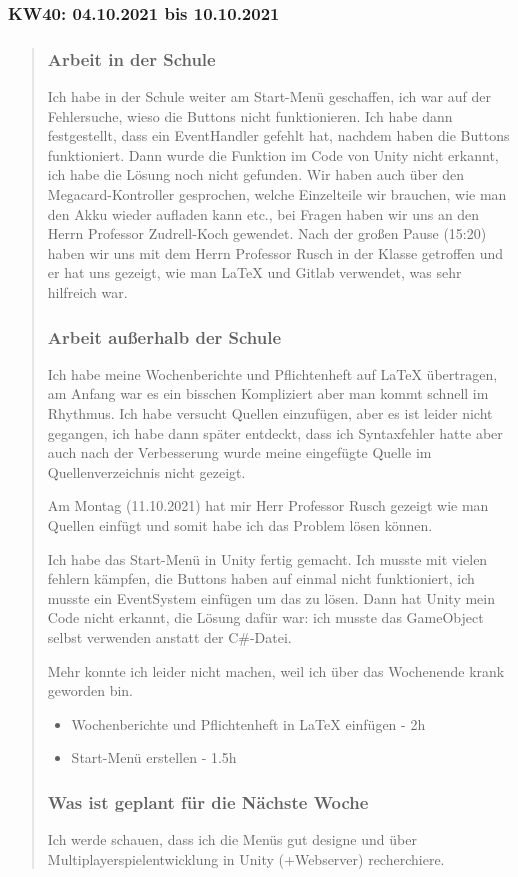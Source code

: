 \subsubsection{KW40: 04.10.2021 bis 10.10.2021}
\begin{quote}
	\subsubsection*{Arbeit in der Schule}
	Ich habe in der Schule weiter am Start-Menü geschaffen, ich war auf der Fehlersuche, wieso die Buttons nicht funktionieren. Ich habe dann festgestellt, dass ein EventHandler gefehlt hat, nachdem haben die Buttons funktioniert. Dann wurde die Funktion im Code von Unity nicht erkannt, ich habe die Lösung noch nicht gefunden. Wir haben auch über den Megacard-Kontroller gesprochen, welche Einzelteile wir brauchen, wie man den Akku wieder aufladen kann etc., bei Fragen haben wir uns an den Herrn Professor Zudrell-Koch gewendet. Nach der großen Pause (15:20) haben wir uns mit dem Herrn Professor Rusch in der Klasse getroffen und er hat uns gezeigt, wie man LaTeX und Gitlab verwendet, was sehr hilfreich war.
	
	\subsubsection*{Arbeit außerhalb der Schule}
	Ich habe meine Wochenberichte und Pflichtenheft auf LaTeX übertragen, am Anfang war es ein bisschen Kompliziert aber man kommt schnell im Rhythmus. Ich habe versucht Quellen einzufügen, aber es ist leider nicht gegangen, ich habe dann später entdeckt, dass ich Syntaxfehler hatte aber auch nach der Verbesserung wurde meine eingefügte Quelle im Quellenverzeichnis nicht gezeigt.
	
	Am Montag (11.10.2021) hat mir Herr Professor Rusch gezeigt wie man Quellen einfügt und somit habe ich das Problem lösen können.
	
	Ich habe das Start-Menü in Unity fertig gemacht. Ich musste mit vielen fehlern kämpfen, die Buttons haben auf einmal nicht funktioniert, ich musste ein EventSystem einfügen um das zu lösen. Dann hat Unity mein Code nicht erkannt, die Lösung dafür war: ich musste das GameObject selbst verwenden anstatt der C\#-Datei.
	
	Mehr konnte ich leider nicht machen, weil ich über das Wochenende krank geworden bin. 
	
	\begin{itemize}
		\item Wochenberichte und Pflichtenheft in LaTeX einfügen - 2h
		\item Start-Menü erstellen - 1.5h
	\end{itemize}

	\subsubsection*{Was ist geplant für die Nächste Woche}
	Ich werde schauen, dass ich die Menüs gut designe und über Multiplayerspielentwicklung in Unity (+Webserver) recherchiere.
\end{quote}